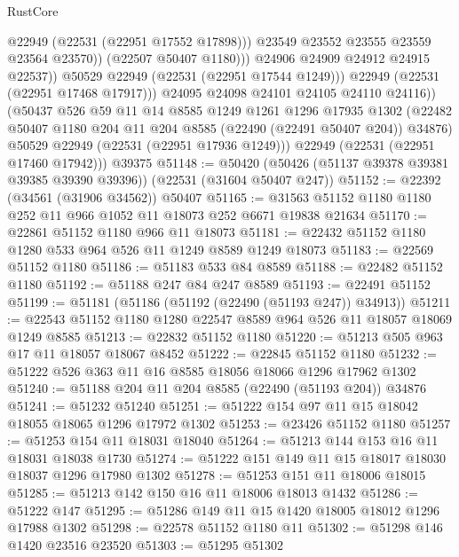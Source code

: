 \begin{lexlean}{RustCore}
\begin{coremodule}
                            @22949
                            (@22531 (@22951 @17552 @17898)))
                          @23549
                          @23552
                          @23555
                          @23559
                          @23564
                          @23570))
                      (@22507 @50407 @1180)))
                  @24906
                  @24909
                  @24912
                  @24915
                  @22537))
              @50529
              @22949
              (@22531 (@22951 @17544 @1249)))
            @22949
            (@22531 (@22951 @17468 @17917)))
          @24095
          @24098
          @24101
          @24105
          @24110
          @24116))
      (@50437
        @526
        @59
        @11
        @14
        @8585
        @1249
        @1261
        @1296
        @17935
        @1302
        (@22482 @50407 @1180 @204 @11 @204 @8585 (@22490 (@22491 @50407 @204)) @34876)
        @50529
        @22949
        (@22531 (@22951 @17936 @1249)))
      @22949
      (@22531 (@22951 @17460 @17942)))
    @39375
@51148 := @50420 (@50426 (@51137 @39378 @39381 @39385 @39390 @39396)) (@22531 (@31604 @50407 @247))
@51152 := @22392 (@34561 (@31906 @34562)) @50407
@51165 := @31563 @51152 @1180 @1180 @252 @11 @966 @1052 @11 @18073 @252 @6671 @19838 @21634
@51170 := @22861 @51152 @1180 @966 @11 @18073
@51181 := @22432 @51152 @1180 @1280 @533 @964 @526 @11 @1249 @8589 @1249 @18073
@51183 := @22569 @51152 @1180
@51186 := @51183 @533 @84 @8589
@51188 := @22482 @51152 @1180
@51192 := @51188 @247 @84 @247 @8589
@51193 := @22491 @51152
@51199 := @51181 (@51186 (@51192 (@22490 (@51193 @247)) @34913))
@51211 := @22543 @51152 @1180 @1280 @22547 @8589 @964 @526 @11 @18057 @18069 @1249 @8585
@51213 := @22832 @51152 @1180
@51220 := @51213 @505 @963 @17 @11 @18057 @18067 @8452
@51222 := @22845 @51152 @1180
@51232 := @51222 @526 @363 @11 @16 @8585 @18056 @18066 @1296 @17962 @1302
@51240 := @51188 @204 @11 @204 @8585 (@22490 (@51193 @204)) @34876
@51241 := @51232 @51240
@51251 := @51222 @154 @97 @11 @15 @18042 @18055 @18065 @1296 @17972 @1302
@51253 := @23426 @51152 @1180
@51257 := @51253 @154 @11 @18031 @18040
@51264 := @51213 @144 @153 @16 @11 @18031 @18038 @1730
@51274 := @51222 @151 @149 @11 @15 @18017 @18030 @18037 @1296 @17980 @1302
@51278 := @51253 @151 @11 @18006 @18015
@51285 := @51213 @142 @150 @16 @11 @18006 @18013 @1432
@51286 := @51222 @147
@51295 := @51286 @149 @11 @15 @1420 @18005 @18012 @1296 @17988 @1302
@51298 := @22578 @51152 @1180 @11
@51302 := @51298 @146 @1420 @23516 @23520
@51303 := @51295 @51302

\end{coremodule}
\end{lexlean}
